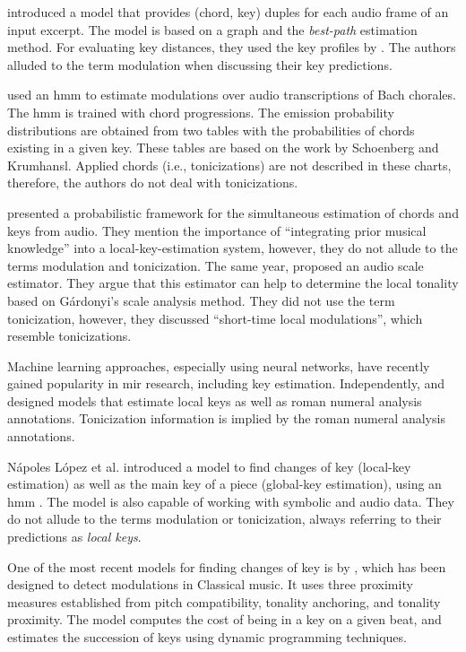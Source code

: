 \textcite{rocher2010concurrent} introduced a model that
provides (chord, key) duples for each audio frame of an
input excerpt. The model is based on a graph and the
\emph{best-path} estimation method. For evaluating key
distances, they used the key profiles by
\textcite{temperley1999whats}. The authors alluded to the
term modulation when discussing their key predictions.

\textcite{mearns2011automatically} used an \gls{hmm} to estimate
modulations over audio transcriptions of Bach chorales. The
\gls{hmm} is trained with chord progressions. The emission
probability distributions are obtained from two tables with
the probabilities of chords existing in a given key. These
tables are based on the work by Schoenberg and Krumhansl.
Applied chords (i.e., tonicizations) are not described in
these charts, therefore, the authors do not deal with
tonicizations.

\textcite{pauwels2014combining} presented a probabilistic
framework for the simultaneous estimation of chords and keys
from audio. They mention the importance of ``integrating
prior musical knowledge'' into a local-key-estimation
system, however, they do not allude to the terms modulation
and tonicization. The same year,
\textcite{weis2014chromabased} proposed an audio scale
estimator. They argue that this estimator can help to
determine the local tonality based on G\'{a}rdonyi's scale
analysis method. They did not use the term tonicization,
however, they discussed ``short-time local modulations'',
which resemble tonicizations.

Machine learning approaches, especially using neural
networks, have recently gained popularity in \gls{mir} research,
including key estimation. Independently,
\textcite{chen2018functional, chen2019harmony} and
\textcite{micchi2020not} designed models that estimate local
keys as well as roman numeral analysis annotations.
Tonicization information is implied by the roman numeral
analysis annotations.

N\'apoles L\'opez et al. introduced a model to find changes
of key (local-key estimation) as well as the main key of a
piece (global-key estimation), using an \gls{hmm}
\textcite{napoleslopez2019keyfinding}. The model is also
capable of working with symbolic and audio data. They do not
allude to the terms modulation or tonicization, always
referring to their predictions as \emph{local keys}.

One of the most recent models for finding changes of key is
by \textcite{feisthauer2020estimating}, which has been
designed to detect modulations in Classical music. It uses
three proximity measures established from pitch
compatibility, tonality anchoring, and tonality proximity.
The model computes the cost of being in a key on a given
beat, and estimates the succession of keys using dynamic
programming techniques.
